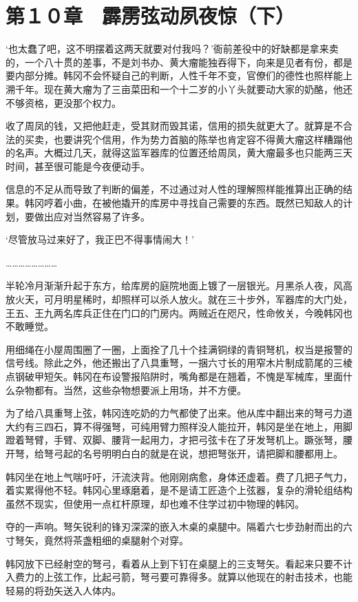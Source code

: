 \section{第１０章　霹雳弦动夙夜惊（下）}

‘也太蠢了吧，这不明摆着这两天就要对付我吗？’衙前差役中的好缺都是拿来卖的，一个八十贯的差事，不是刘书办、黄大瘤能独吞得下，向来是见者有份，都是要内部分摊。韩冈不会怀疑自己的判断，人性千年不变，官僚们的德性也照样能上溯千年。现在黄大瘤为了三亩菜田和一个十二岁的小丫头就要动大家的奶酪，他还不够资格，更没那个权力。

收了周凤的钱，又把他赶走，受其财而毁其诺，信用的损失就更大了。就算是不合法的买卖，也要讲究个信用，作为势力首脑的陈举也肯定容不得黄大瘤这样糟蹋他的名声。大概过几天，就得这监军器库的位置还给周凤，黄大瘤最多也只能两三天时间，甚至很可能是今夜便动手。

信息的不足从而导致了判断的偏差，不过通过对人性的理解照样能推算出正确的结果。韩冈哼着小曲，在被他撬开的库房中寻找自己需要的东西。既然已知敌人的计划，要做出应对当然容易了许多。

‘尽管放马过来好了，我正巴不得事情闹大！’

……………………

半轮冷月渐渐升起于东方，给库房的庭院地面上镀了一层银光。月黑杀人夜，风高放火天，可月明星稀时，却照样可以杀人放火。就在三十步外，军器库的大门处，王五、王九两名库兵正住在门口的门房内。两贼近在咫尺，性命攸关，今晚韩冈也不敢睡觉。

用细绳在小屋周围圈了一圈，上面拴了几十个挂满铜绿的青铜弩机，权当是报警的信号线。除此之外，他还搬出了八具重弩，一捆六寸长的用窄木片制成箭尾的三棱点钢破甲短矢。韩冈在布设警报陷阱时，嘴角都是在翘着，不愧是军械库，里面什么杂物都有。当然，这些杂物想要派上用场，并不方便。

为了给八具重弩上弦，韩冈连吃奶的力气都使了出来。他从库中翻出来的弩弓力道大约有三四石，算不得强弩，可纯用臂力照样没人能拉开，韩冈是坐在地上，用脚蹬着弩臂，手臂、双脚、腰背一起用力，才把弓弦卡在了牙发弩机上。蹶张弩，腰开弩，给弩弓起的名号明明白白的就是在说，想把弩张开，请把脚和腰都用上。

韩冈坐在地上气喘吁吁，汗流浃背。他刚刚病愈，身体还虚着。费了几把子气力，着实累得他不轻。韩冈心里琢磨着，是不是请工匠造个上弦器，复杂的滑轮组结构虽然不现实，但使用一点杠杆原理，却也难不住学过初中物理的韩冈。

夺的一声响。弩矢锐利的锋刃深深的嵌入木桌的桌腿中。隔着六七步劲射而出的六寸弩矢，竟然将茶盏粗细的桌腿射个对穿。

韩冈放下已经射空的弩弓，看着从上到下钉在桌腿上的三支弩矢。看起来只要不计入费力的上弦工作，比起弓箭，弩弓要可靠得多。就算以他现在的射击技术，也能轻易的将劲矢送入人体内。

